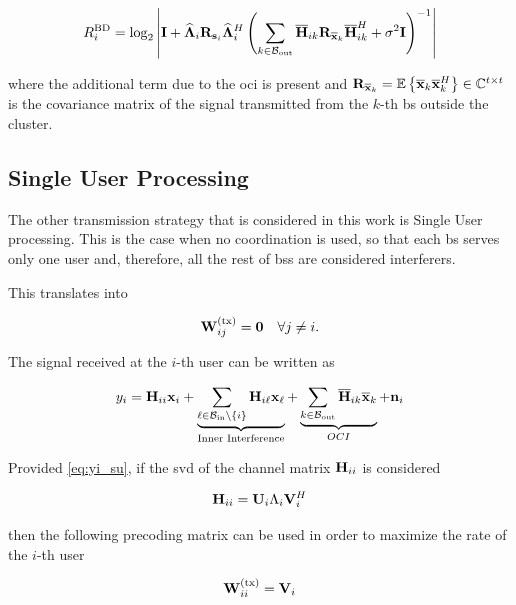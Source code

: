 \begin{equation} \label{eq:bd_rate_oci}
    R_{i}^{\text{BD}} = \log_2\left|\mathbf{I} + \mathbf{\widehat{\Lambda}}_i \mathbf{R}_{\mathbf{s}_i}
    \mathbf{\widehat{\Lambda}}_i^H \left(\sum\limits_{k \in \mathcal{B}_{\text{out}}} \mathbf{\overline{H}}_{ik} \mathbf{R}_{\mathbf{\overline{x}}_k}
    \mathbf{\overline{H}}_{ik}^H + \sigma^2\mathbf{I}\right)^{-1}\right|
\end{equation}

\noindent
where the additional term due to the \gls{oci} is present and $\mathbf{R}_{\mathbf{\overline{x}}_k} =
\mathbb{E}\left\{\mathbf{\overline{x}}_k \mathbf{\overline{x}}_k^H\right\} \in \mathbb{C}^{t \times t}$ is the covariance matrix
of the signal transmitted from the $k$-th \gls{bs} outside the cluster.

\subsection{Single User Processing} \label{ssec:sched_su}

The other transmission strategy that is considered in this work is Single User
processing. This is the case when no coordination is used, so that each \gls{bs}
serves only one user and, therefore, all the rest of \glspl{bs} are considered
interferers.

This translates into

\begin{equation} \label{eq:wtx_su}
    \mathbf{W}^{(\text{tx})}_{ij} = \mathbf{0} \quad \forall j \neq i.
\end{equation}

The signal received at the $i$-th user can be written as

\begin{equation} \label{eq:yi_su}
    y_i = \mathbf{H}_{ii}\mathbf{x}_i + \underbrace{\sum\limits_{\ell \in \mathcal{B}_{\text{in}} \backslash
    \left\{i\right\}} \mathbf{H}_{i\ell} \mathbf{x}_{\ell}}_{\text{Inner Interference}} +
    \underbrace{\sum\limits_{k \in \mathcal{B}_{\text{out}}} \mathbf{\overline{H}}_{ik} \mathbf{\overline{x}}_k}_{OCI} + \mathbf{n}_i
\end{equation}

Provided \eqref{eq:yi_su}, if the \gls{svd} of the channel matrix $\mathbf{H}_{ii}$ is
considered

\begin{equation} \label{eq:hi_svd}
    \mathbf{H}_{ii} = \mathbf{U}_i \Lambda_i \mathbf{V}_i^H
\end{equation}

\noindent
then the following precoding matrix can be used in order to maximize the rate of
the $i$-th user \cite{telatar99}

\begin{equation} \label{eq:precod_su}
    \mathbf{W}^{(\text{tx})}_{ii} = \mathbf{V}_i
\end{equation}

